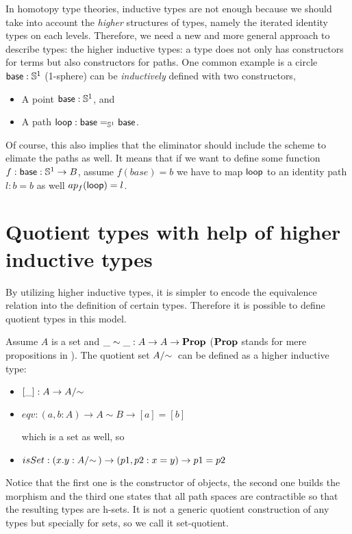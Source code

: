 In homotopy type theories, inductive types are not enough because we
should take into account the \emph{higher} structures of types, namely the iterated identity types on each
levels. Therefore, we need a new and more general approach to describe types: the higher
inductive types: a type does not only has constructors for terms but
also constructors for paths. One common example is a circle
$\base:\Sn^1$ (1-sphere) can be \emph{inductively} defined with two constructors,

\begin{itemize}
\item A point $\base:\Sn^1$, and
\item A path $\lloop : {\id[\Sn^1]\base\base}$.
\end{itemize}

Of course, this also implies that the eliminator should include the
scheme to elimate the paths as well. It means that if we want to
define some function $f : \base:\Sn^1 \rightarrow B$, assume $f(base)=b$ we
have to map $\lloop$ to
an identity path $l : b = b$ as well $ap_f(\lloop)=l$.

\section{Quotient types with help of higher inductive types}

By utilizing higher inductive types, it is simpler to encode the
equivalence relation into the definition of certain types. Therefore
it is possible to define quotient types in this model.

Assume $A$ is a set and $\_\sim\_ : A \rightarrow A \rightarrow \Prop$
($\Prop$ stands for mere propositions in \hott). The quotient set $\qset{A}$
can be defined as a higher inductive type:

\begin{itemize}
\item $[\_] : A \rightarrow \qset{A}$
\item $eqv : (a,b : A) \rightarrow A \sim B \rightarrow  [a] =  [b]$

which is a set as well, so

\item $isSet : (x.y:\qset{A}) \rightarrow (p1,p2 : x = y) \rightarrow p1 = p2$

\end{itemize}

Notice that the first one is the constructor of objects, the second
one builds the morphism and the third one states that all path spaces
are contractible so that the resulting types are h-sets. It is not a
generic quotient construction of any types but specially for sets, so we call it set-quotient. 




